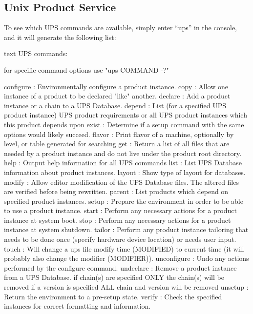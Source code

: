 \documentclass[8pt]{refart}
\begin{document}
\subsection{Unix Product Service}
To see which UPS commands are available, simply enter ``ups'' in the console, and it will generate the following list:
\begin{code}{text}
UPS commands:

for specific command options use "ups COMMAND -?"

          configure   : Environmentally configure a product instance.
          copy        : Allow one instance of a product to be declared 
                        "like" another.
          declare     : Add a product instance or a chain to a UPS Database.
          depend      : List (for a specified UPS product instance) 
                        UPS product requirements or all UPS product instances 
                        which this product depends upon
          exist       : Determine if a setup command with the same options 
                        would likely succeed.
          flavor      : Print flavor of a machine, optionally by 
                        level, or table generated for searching
          get         : Return a list of all files that are needed 
                        by a product instance and do not live under 
                        the product root directory.
          help        : Output help information for all UPS commands
          list        : List UPS Database information about product instances.
          layout      : Show type of layout for databases.
          modify      : Allow editor modification of the UPS Database files.  
                        The altered files are verified before being rewritten.
          parent      : List products which depend on specified product instances.
          setup       : Prepare the environment in order to be able 
                        to use a product instance.
          start       : Perform any necessary actions for a product 
                        instance at system boot.
          stop        : Perform any necessary actions for a product 
                        instance at system shutdown.
          tailor      : Perform any product instance tailoring that needs 
                        to be done once (specify hardware device location)
                        or needs user input.
          touch       : Will change a ups file modify time (MODIFIED) to current time
                        (it will probably also change the modifier (MODIFIER)).
          unconfigure : Undo any actions performed by the configure command.
          undeclare   : Remove a product instance from a UPS Database. 
                        if chain(s) are specified ONLY the chain(s) will 
                        be removed if a version is specified ALL chain and 
                        version will be removed
          unsetup     : Return the environment to a pre-setup state.
          verify      : Check the specified instances for correct formatting 
                        and information.
\end{code}
\end{document}
